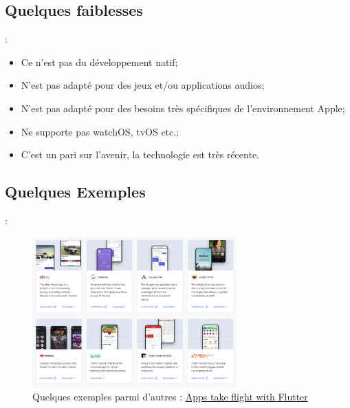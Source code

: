 \documentclass[10pt]{beamer}
\begin{document}
\subsection{Quelques faiblesses}
\begin{frame}[fragile,t]{\secname : \subsecname}
    \begin{itemize}
        \item Ce n'est pas du développement natif;
        \item N'est pas adapté pour des jeux et/ou applications audios;
        \item N'est pas adapté pour des besoins très spécifiques de l'environnement Apple;
        \item Ne supporte pas watchOS, tvOS etc.;
        \item C'est un pari sur l'avenir, la technologie est très récente.
    \end{itemize}
\end{frame}

\subsection{Quelques Exemples}
\begin{frame}[fragile,t]{\secname : \subsecname}
    \begin{figure}[H]
        \begin{center}
            \includegraphics[width=0.7\textwidth]{../assets/img/exemples.jpg}
            \caption*{Quelques exemples parmi d'autres : \href{https://flutter.dev/showcase}{Apps take flight with Flutter}}
            \label{Fig:exemples}
        \end{center}
    \end{figure}
\end{frame}
\end{document}

